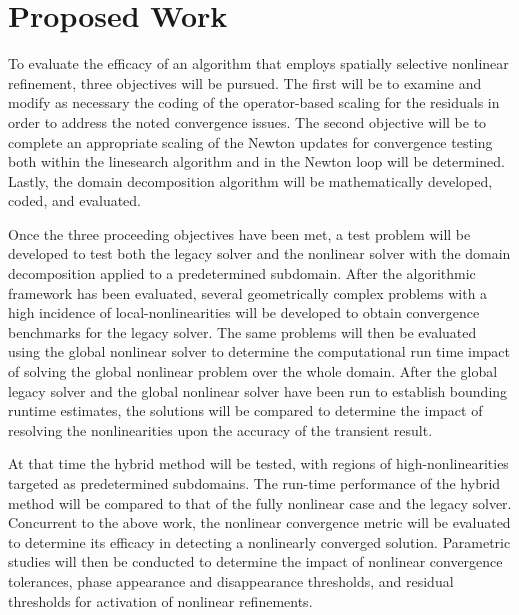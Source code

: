 \chapter{Proposed Work}
\label{chap:proposal}
To evaluate the efficacy of an algorithm that employs  spatially selective nonlinear refinement, three objectives will be pursued.
The first will be to examine and modify as necessary the coding of the operator-based scaling for the residuals in order to address the noted convergence issues.
The second objective will be to complete an appropriate scaling of the Newton updates for convergence testing both within the linesearch algorithm and in the Newton loop will be determined.
Lastly, the domain decomposition algorithm will be mathematically developed, coded, and evaluated.

Once the three proceeding objectives have been met, a test problem will be developed to test both the legacy solver and the nonlinear solver with the domain decomposition applied to a predetermined subdomain.
After the algorithmic framework has been evaluated, several geometrically complex problems with a high incidence of local-nonlinearities will be developed to obtain convergence benchmarks for the legacy solver.
The same problems will then be evaluated using the global nonlinear solver to determine the computational run time impact of solving the global nonlinear problem over the whole domain. 
After the global legacy solver and the global nonlinear solver have been run to establish bounding runtime estimates, the solutions will be compared to determine the impact of resolving the nonlinearities upon the accuracy of the transient result.

At that time the hybrid method will be tested, with regions of high-nonlinearities targeted as predetermined subdomains.
The run-time performance of the hybrid method will be compared to that of the fully nonlinear case and the legacy solver.
Concurrent to the above work, the nonlinear convergence metric will be evaluated to determine its efficacy in detecting a nonlinearly converged solution.
Parametric studies will then be conducted to determine the impact of nonlinear convergence tolerances, phase appearance and disappearance thresholds, and residual thresholds for activation of nonlinear refinements.

